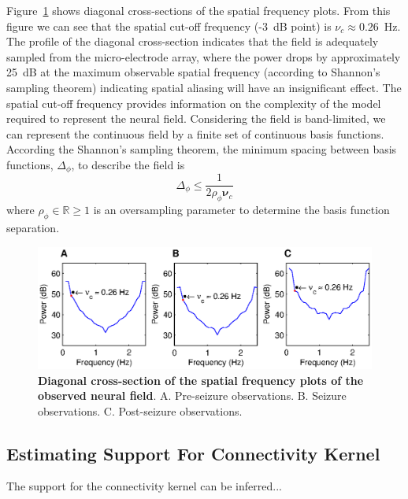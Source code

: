 \documentclass[]{article}
\begin{document}
Figure~\ref{fig:DiagSpatialFreqObservation} shows diagonal cross-sections of the spatial frequency plots. From this figure we can see that the spatial cut-off frequency (-3~dB point) is $\nu_c \approx 0.26$~Hz. The profile of the diagonal cross-section indicates that the field is adequately sampled from the micro-electrode array, where the power drops by approximately 25~dB at the maximum observable spatial frequency (according to Shannon's sampling theorem) indicating spatial aliasing will have an insignificant effect. The spatial cut-off frequency provides information on the complexity of the model required to represent the neural field. Considering the field is band-limited, we can represent the continuous field by a finite set of continuous basis functions. According the Shannon's sampling theorem, the minimum spacing between basis functions, $\Delta_{\phi}$, to describe the field is
\begin{equation}\label{eq:BasisFunctionSeparation}
	\Delta_{\phi} \leq \frac{1}{2\rho_{\phi}\boldsymbol{\nu}_{c}}
\end{equation}
where $\rho_{\phi} \in \mathbb{R} \ge 1$ is an oversampling parameter to determine the basis function separation.

\begin{figure}[!ht]
\begin{center}
\includegraphics{./Figures/SpatialFreqCrossSection.eps}
\end{center}
\caption{{\bf Diagonal cross-section of the spatial frequency plots of the observed neural field}. A. Pre-seizure observations. B. Seizure observations. C. Post-seizure observations.}
\label{fig:DiagSpatialFreqObservation}
\end{figure}

\subsection{Estimating Support For Connectivity Kernel}
The support for the connectivity kernel can be inferred...
\end{document}
